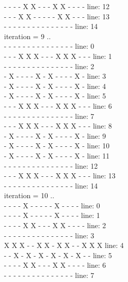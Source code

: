 \documentclass[a4paper, 14pt]{article}
\begin{document}
\begin{enumerate}
{ -  -  -  -  X  X  -  -  -  X  X  -  -  -  - 	line: 12\\
 -  -  -  X  X  -  -  -  -  -  X  X  -  -  - 	line: 13\\
 -  -  -  -  -  -  -  -  -  -  -  -  -  -  - 	line: 14\\
iteration = 9 ..\\
 -  -  -  -  -  -  -  -  -  -  -  -  -  -  - 	line: 0\\
 -  -  -  X  X  X  -  -  -  X  X  X  -  -  - 	line: 1\\
 -  -  -  -  -  -  -  -  -  -  -  -  -  -  - 	line: 2\\
 -  X  -  -  -  -  X  -  X  -  -  -  -  X  - 	line: 3\\
 -  X  -  -  -  -  X  -  X  -  -  -  -  X  - 	line: 4\\
 -  X  -  -  -  -  X  -  X  -  -  -  -  X  - 	line: 5\\
 -  -  -  X  X  X  -  -  -  X  X  X  -  -  - 	line: 6\\
 -  -  -  -  -  -  -  -  -  -  -  -  -  -  - 	line: 7\\
 -  -  -  X  X  X  -  -  -  X  X  X  -  -  - 	line: 8\\
 -  X  -  -  -  -  X  -  X  -  -  -  -  X  - 	line: 9\\
 -  X  -  -  -  -  X  -  X  -  -  -  -  X  - 	line: 10\\
 -  X  -  -  -  -  X  -  X  -  -  -  -  X  - 	line: 11\\
 -  -  -  -  -  -  -  -  -  -  -  -  -  -  - 	line: 12\\
 -  -  -  X  X  X  -  -  -  X  X  X  -  -  - 	line: 13\\
 -  -  -  -  -  -  -  -  -  -  -  -  -  -  - 	line: 14\\
iteration = 10 ..\\
 -  -  -  -  X  -  -  -  -  -  X  -  -  -  - 	line: 0\\
 -  -  -  -  X  -  -  -  -  -  X  -  -  -  - 	line: 1\\
 -  -  -  -  X  X  -  -  -  X  X  -  -  -  - 	line: 2\\
 -  -  -  -  -  -  -  -  -  -  -  -  -  -  - 	line: 3\\
 X  X  X  -  -  X  X  -  X  X  -  -  X  X  X 	line: 4\\
 -  -  X  -  X  -  X  -  X  -  X  -  X  -  - 	line: 5\\
 -  -  -  -  X  X  -  -  -  X  X  -  -  -  - 	line: 6\\
 -  -  -  -  -  -  -  -  -  -  -  -  -  -  - 	line: 7\\
}
\end{enumerate}
\end{document}
